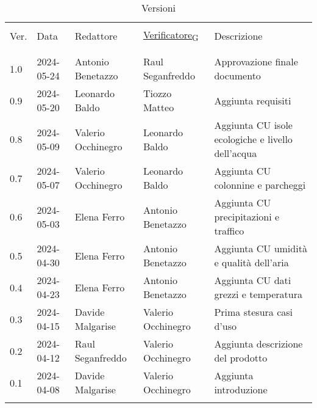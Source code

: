 \documentclass[12pt]{article}
\begin{document}


\newpage



\captionsetup[table]{list=no}
\begin{table}[!h]
	\footnotesize
	\begin{center}
		\caption*{Versioni}
		\vspace{0.5cm}
		\begin{tabular}{ l l l l p{6.1cm} }
			\hline                                                                                                          \\[-2ex]
			Ver. & Data & Redattore & \href{https://7last.github.io/docs/rtb/documentazione-interna/glossario\#verificatore}{Verificatore\textsubscript{G}} & Descrizione\\
			\\[-2ex] \hline \\[-1.5ex]
			1.0 & 2024-05-24 & Antonio Benetazzo & Raul Seganfreddo & Approvazione finale documento\\
			0.9 & 2024-05-20 & Leonardo Baldo & Tiozzo Matteo & Aggiunta requisiti\\
			0.8 & 2024-05-09 & Valerio Occhinegro & Leonardo Baldo & Aggiunta CU isole ecologiche e livello dell'acqua \\
			0.7 & 2024-05-07 & Valerio Occhinegro & Leonardo Baldo & Aggiunta CU colonnine e parcheggi\\
			0.6 & 2024-05-03 & Elena Ferro & Antonio Benetazzo & Aggiunta CU precipitazioni e traffico\\
			0.5 & 2024-04-30 & Elena Ferro & Antonio Benetazzo & Aggiunta CU umidità e qualità dell'aria\\
			0.4 & 2024-04-23 & Elena Ferro & Antonio Benetazzo & Aggiunta CU dati grezzi e temperatura\\
			0.3 & 2024-04-15 & Davide Malgarise & Valerio Occhinegro & Prima stesura casi d'uso\\
			0.2 & 2024-04-12 & Raul Seganfreddo & Valerio Occhinegro & Aggiunta descrizione del prodotto \\
			0.1 & 2024-04-08 & Davide Malgarise & Valerio Occhinegro & Aggiunta introduzione \\
			\\[-1.5ex] \hline
		\end{tabular}
	\end{center}
\end{table}
\captionsetup[table]{list=yes}

\newpage

\tableofcontents
\listoftables
\listoffigures

\newpage








\end{document}
